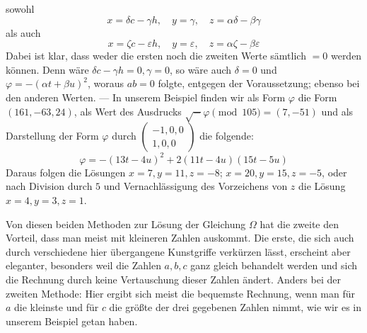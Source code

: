 sowohl
\[
x=\delta c-\gamma h,\quad y=\gamma,\quad z=\alpha\delta-\beta\gamma
\]
als auch
\[
x=\zeta c-\varepsilon h,\quad y=\varepsilon,\quad z=\alpha\zeta-\beta\varepsilon
\]
Dabei ist klar, dass weder die ersten noch die zweiten
Werte sämtlich \(=0\) werden können. Denn wäre \(\delta c-\gamma h=0,\gamma=0\),
so wäre auch \(\delta=0\) und \(\varphi=-(\alpha t+\beta u)^2\), woraus \(ab=0\) folgte,
entgegen der Voraussetzung; ebenso bei den anderen Werten.
--- In unserem Beispiel finden wir als Form \(\varphi\) die
Form \((161,-63,24)\), als Wert des Ausdrucks \(\surd-\varphi\pmod{105}=(7,-51)\) und als
Darstellung der Form \(\varphi\) durch \(\left(\begin{smallmatrix}-1,0,0\\1,0,0\end{smallmatrix}\right)\) die folgende:
\[
\varphi=-(13t-4u)^2+2(11t-4u)(15t-5u)
\]
Daraus folgen die Lösungen \(x=7,y=11,z=-8\); \(x=20,y=15,z=-5\), oder nach
Division durch \(5\) und Vernachlässigung des Vorzeichens
von \(z\) die Lösung \(x=4,y=3,z=1\).

Von diesen beiden Methoden zur Lösung der Gleichung \(\Omega\)
hat die zweite den Vorteil, dass man meist mit kleineren
Zahlen auskommt. Die erste, die sich auch durch verschiedene
hier übergangene Kunstgriffe verkürzen lässt, erscheint aber
eleganter, besonders weil die Zahlen \(a,b,c\) ganz gleich
behandelt werden und sich die Rechnung durch keine Vertauschung
dieser Zahlen ändert. Anders bei der zweiten Methode: Hier
ergibt sich meist die bequemste Rechnung, wenn man für
\(a\) die kleinste und für \(c\) die größte der drei
gegebenen Zahlen nimmt, wie wir es in unserem Beispiel
getan haben.

